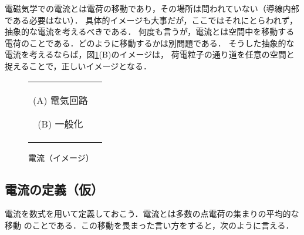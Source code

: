     電磁気学での電流とは電荷の移動であり，その場所は問われていない（導線内部である必要はない）．
        具体的イメージも大事だが，ここではそれにとらわれず，抽象的な電流を考えるべきである．
        何度も言うが，電流とは空間中を移動する電荷のことである．どのように移動するかは別問題である．
        そうした抽象的な電流を考えるならば，図\ref{fig:EM_Denryu01}(B)のイメージは，
        荷電粒子の通り道を任意の空間と捉えることで，正しいイメージとなる．
        \begin{figure}[hbt]
            \begin{tabular}{cc}
                \begin{minipage}{0.5\hsize}
                    \begin{center}
                        {EM_Denryu01.pdf}

                        (A) 電気回路
                    \end{center}
                \end{minipage}
                \begin{minipage}{0.5\hsize}
                    \begin{center}
                        {EM_Denryu02.pdf}

                        (B) 一般化
                    \end{center}
                \end{minipage}
            \end{tabular}
            \caption{電流（イメージ）}
            \label{fig:EM_Denryu01}
        \end{figure}



    \subsection{電流の定義（仮）}
        電流を数式を用いて定義しておこう．電流とは多数の点電荷の集まりの平均的な移動
        のことである．この移動を畏まった言い方をすると，次のように言える．

